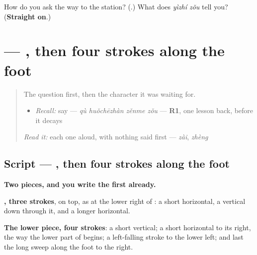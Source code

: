\begin{tcolorbox}[breakable,colback=teal!4,colframe=teal!35!black,title={Before you move on}]
How do you ask the way to the station? (\textbf{}.) What does \emph{yìzhí zǒu} tell you? (\textbf{Straight on}.)
\end{tcolorbox}
\section[\texorpdfstring{\zh{走} (zǒu)}{走 (zǒu)}]{ — , then four strokes along the foot}

\label{lesson:ZH-W283-zou}



\begin{quote}
The question first, then the character it was waiting for.

\begin{itemize}
\raggedright
  \item \emph{Recall:} say  — \emph{qù huǒchēzhàn zěnme zǒu} — \textbf{R1}, one lesson back, before it decays
\end{itemize}

\begin{quote}
 
\end{quote}

\emph{Read it:} each one aloud, with nothing said first — \emph{zài}, \emph{zhèng}
\end{quote}

\subsection*{Script — , then four strokes along the foot}

\begin{quote}
\end{quote}

\textbf{Two pieces, and you write the first already.}

\textbf{, three strokes}, on top, as at the lower right of : a short horizontal, a vertical down through it, and a longer horizontal.

\textbf{The lower piece, four strokes}: a short vertical; a short horizontal to its right, the way the lower part of  begins; a left-falling stroke to the lower left; and last the long sweep along the foot to the right.

